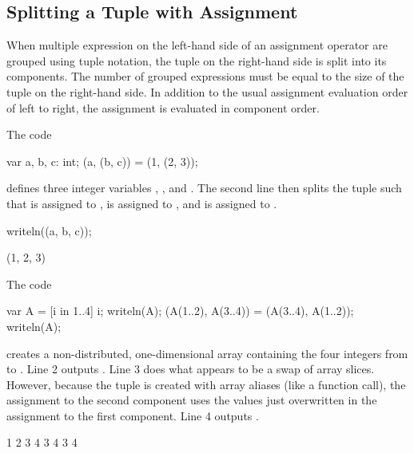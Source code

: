 \subsection{Splitting a Tuple with Assignment}

When multiple expression on the left-hand side of an assignment
operator are grouped using tuple notation, the tuple on the right-hand
side is split into its components.  The number of grouped expressions
must be equal to the size of the tuple on the right-hand side.  In
addition to the usual assignment evaluation order of left to right,
the assignment is evaluated in component order.

\begin{example}
\begin{chapelpre}
\end{chapelpre}
The code
\begin{chapel}
var a, b, c: int;
(a, (b, c)) = (1, (2, 3));
\end{chapel}
defines three integer variables , , and .  The
second line then splits the tuple  such that 
is assigned to ,  is assigned to ,
and  is assigned to .
\begin{chapelpost}
writeln((a, b, c));
\end{chapelpost}
\begin{chapeloutput}
(1, 2, 3)
\end{chapeloutput}
\end{example}

\begin{example}
\begin{chapelpre}
\end{chapelpre}
The code
\begin{chapel}
var A = [i in 1..4] i;
writeln(A);
(A(1..2), A(3..4)) = (A(3..4), A(1..2));
writeln(A);
\end{chapel}
creates a non-distributed, one-dimensional array containing the four
integers from  to .  Line 2 outputs .
Line 3 does what appears to be a swap of array slices.  However,
because the tuple is created with array aliases (like a function
call), the assignment to the second component uses the values just
overwritten in the assignment to the first component.  Line 4
outputs .
\begin{chapelpost}
\end{chapelpost}
\begin{chapeloutput}
1 2 3 4
3 4 3 4
\end{chapeloutput}
\end{example}

